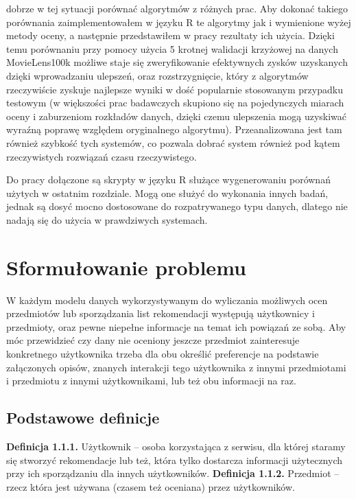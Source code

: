 \documentclass{pracamgr}
\begin{document}
  dobrze w tej sytuacji porównać algorytmów z różnych prac.
  Aby dokonać takiego porównania zaimplementowałem w języku R te algorytmy jak i wymienione wyżej metody oceny,
  a następnie przedstawiłem w pracy rezultaty ich użycia.
  Dzięki temu porównaniu przy pomocy użycia 5 krotnej walidacji krzyżowej na danych
  MovieLens100k \cite{ML} możliwe staje się zweryfikowanie efektywnych zysków uzyskanych dzięki wprowadzaniu ulepszeń,
  oraz rozstrzygnięcie, który z algorytmów rzeczywiście zyskuje najlepsze wyniki w dość popularnie stosowanym przypadku testowym
  (w większości prac badawczych skupiono się na pojedynczych miarach oceny i zaburzeniom rozkładów danych,
  dzięki czemu ulepszenia mogą uzyskiwać wyraźną poprawę względem oryginalnego algorytmu).
  Przeanalizowana jest tam również szybkość tych systemów, co pozwala dobrać system również pod kątem rzeczywistych rozwiązań czasu rzeczywistego.\newline
  
  Do pracy dołączone są skrypty w języku R służące wygenerowaniu porównań użytych w ostatnim rozdziale.
  Mogą one służyć do wykonania innych badań, jednak są dosyć mocno dostosowane do rozpatrywanego typu danych, dlatego nie nadają się do
  użycia w prawdziwych systemach.
  
 \chapter{Sformułowanie problemu}
  W każdym modelu danych wykorzystywanym do wyliczania możliwych ocen przedmiotów lub sporządzania list rekomendacji
  występują użytkownicy i przedmioty, oraz pewne niepełne informacje na temat ich powiązań ze sobą.
  Aby móc przewidzieć czy dany nie oceniony jeszcze przedmiot zainteresuje konkretnego użytkownika trzeba dla obu określić preferencje na podstawie 
  załączonych opisów, znanych interakcji tego użytkownika z innymi przedmiotami i przedmiotu z innymi użytkownikami, lub też obu informacji na raz.
  
  \section{Podstawowe definicje}
   \textbf{Definicja 1.1.1.} Użytkownik -- osoba korzystająca z serwisu, dla której staramy się stworzyć rekomendacje lub też,
    która tylko dostarcza informacji użytecznych przy ich sporządzaniu dla innych użytkowników.\newline\newline
   \textbf{Definicja 1.1.2.} Przedmiot -- rzecz która jest używana (czasem też oceniana) przez użytkowników.\newline
   
\end{document}
